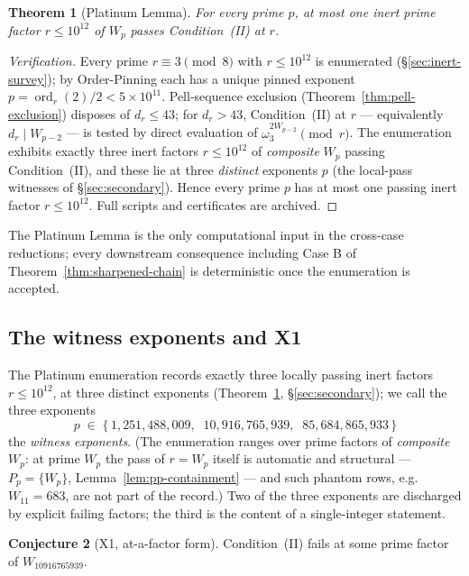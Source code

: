 \documentclass[11pt]{amsart}
\theoremstyle{plain}
\newtheorem{theorem}{Theorem}[section]
\theoremstyle{definition}
\newtheorem{conjecture}[theorem]{Conjecture}
\theoremstyle{remark}
\numberwithin{equation}{section}
\newcommand{\ord}{\operatorname{ord}}
\begin{document}
\begin{theorem}[Platinum Lemma]\label{thm:platinum}
For every prime $p$, at most one inert prime factor $r \leq 10^{12}$ of $W_p$ passes Condition~(II) at $r$.
\end{theorem}

\begin{proof}[Verification]
Every prime $r \equiv 3 \pmod 8$ with $r \leq 10^{12}$ is enumerated (\S\ref{sec:inert-survey}); by Order-Pinning each has a unique pinned exponent $p = \ord_r(2)/2 < 5 \times 10^{11}$. Pell-sequence exclusion (Theorem~\ref{thm:pell-exclusion}) disposes of $d_r \leq 43$; for $d_r > 43$, Condition~(II) at $r$ --- equivalently $d_r \mid W_{p-2}$ --- is tested by direct evaluation of $\omega_3^{2 W_{p-2}} \pmod r$. The enumeration exhibits exactly three inert factors $r \leq 10^{12}$ of \emph{composite} $W_p$ passing Condition~(II), and these lie at three \emph{distinct} exponents $p$ (the local-pass witnesses of \S\ref{sec:secondary}). Hence every prime $p$ has at most one passing inert factor $r \leq 10^{12}$. Full scripts and certificates are archived.
\end{proof}

The Platinum Lemma is the only computational input in the cross-case reductions; every downstream consequence including Case B of Theorem~\ref{thm:sharpened-chain} is deterministic once the enumeration is accepted.

\subsection{The witness exponents and X1}\label{sec:x1}

The Platinum enumeration records exactly three locally passing inert factors $r \leq 10^{12}$, at three distinct exponents (Theorem~\ref{thm:platinum}, \S\ref{sec:secondary}); we call the three exponents
\[
  p \;\in\; \{\,1{,}251{,}488{,}009,\;\; 10{,}916{,}765{,}939,\;\; 85{,}684{,}865{,}933\,\}
\]
the \emph{witness exponents}. (The enumeration ranges over prime factors of \emph{composite} $W_p$: at prime $W_p$ the pass of $r = W_p$ itself is automatic and structural --- $P_p = \{W_p\}$, Lemma~\ref{lem:pp-containment} --- and such phantom rows, e.g.\ $W_{11} = 683$, are not part of the record.) Two of the three exponents are discharged by explicit failing factors; the third is the content of a single-integer statement.

\begin{conjecture}[X1, at-a-factor form]\label{conj:x1}
Condition~(II) fails at some prime factor of $W_{10916765939}$.
\end{conjecture}
\end{document}
